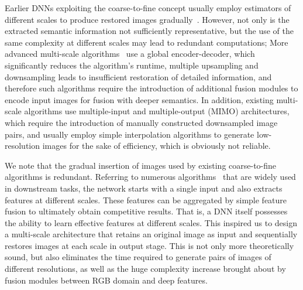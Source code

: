 \documentclass[10pt,twocolumn,letterpaper]{article}
\begin{document}
Earlier DNNs exploiting the coarse-to-fine concept usually employ estimators of different scales to produce restored images gradually~\cite{tao2018scale,nah2017deep,park2020multi}. However, not only is the extracted semantic information not sufficiently representative, but the use of the same complexity at different scales may lead to redundant computations; More advanced multi-scale algorithms~\cite{cho2021rethinking} use a global encoder-decoder, which significantly reduces the algorithm's runtime, multiple upsampling and downsampling leads to insufficient restoration of detailed information, and therefore such algorithms require the introduction of additional fusion modules to encode input images for fusion with deeper semantics. In addition, existing multi-scale algorithms use multiple-input and multiple-output (MIMO) architectures, which require the introduction of manually constructed downsampled image pairs, and usually employ simple interpolation algorithms to generate low-resolution images for the sake of efficiency, which is obviously not reliable.

We note that the gradual insertion of images used by existing coarse-to-fine algorithms is redundant. Referring to numerous algorithms~\cite{lin2017feature,tan2020efficientdet,liu2018path,ghiasi2019fpn,kim2022mstr,wang2023yolov7} that are widely used in downstream tasks, the network starts with a single input and also extracts features at different scales. These features can be aggregated by simple feature fusion to ultimately obtain competitive results. That is, a DNN itself possesses the ability to learn effective features at different scales. This inspired us to design a multi-scale architecture that retains an original image as input and sequentially restores images at each scale in output stage. This is not only more theoretically sound, but also eliminates the time required to generate pairs of images of different resolutions, as well as the huge complexity increase brought about by fusion modules between RGB domain and deep features.
\end{document}
